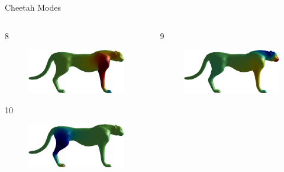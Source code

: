 \documentclass{beamer}
\begin{document}
\begin{frame}{Cheetah Modes}

\begin{columns}
\begin{column}[T]{5cm}
8
\begin{figure}[t]
    \includegraphics[width=\textwidth]{Harmonics/CheetahModes/8.png}
\end{figure}
10
\begin{figure}[t]
    \includegraphics[width=\textwidth]{Harmonics/CheetahModes/10.png}
\end{figure}
\end{column}
\begin{column}[T]{5cm}
9
\begin{figure}[t]
    \includegraphics[width=\textwidth]{Harmonics/CheetahModes/9.png}

\end{figure}
\end{column}
\end{columns}
\end{frame}
\end{document}
